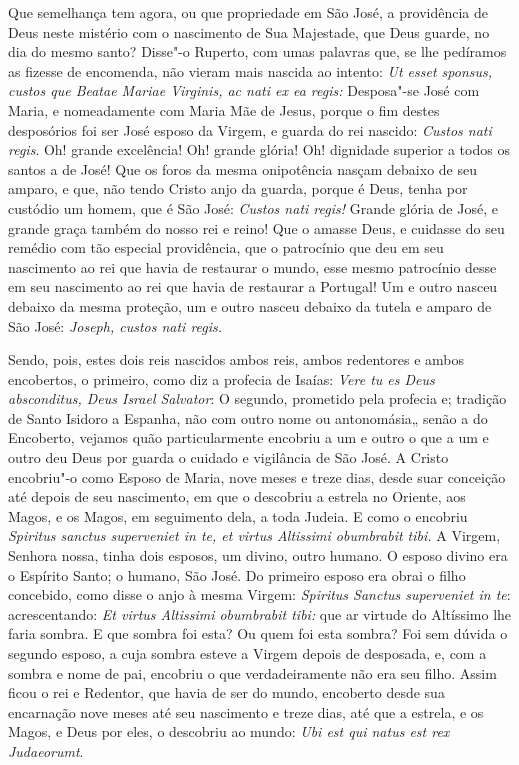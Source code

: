 Que semelhança tem agora, ou que propriedade em São José, a providência
de Deus neste mistério com o nascimento de Sua Majestade, que Deus
guarde, no dia do mesmo santo? Disse"-o Ruperto, com umas palavras que,
se lhe pedíramos as fizesse de encomenda, não vieram mais nascida ao
intento: \emph{Ut esset sponsus, custos que Beatae Mariae Virginis, ac
nati ex ea regis:} Desposa"-se José com Maria, e nomeadamente com Maria
Mãe de Jesus, porque o fim destes desposórios foi ser José esposo da
Virgem, e guarda do rei
nascido: \emph{Custos nati regis}. Oh! grande excelência! Oh! grande
glória! Oh! dignidade superior a todos os santos a de José! Que os foros
da mesma onipotência nasçam debaixo de seu amparo, e que, não tendo
Cristo anjo da guarda, porque é Deus, tenha por custódio um homem, que é
São José: \emph{Custos nati regis!} Grande glória de José, e grande
graça também do nosso rei e reino! Que o amasse Deus, e cuidasse do seu
remédio com tão especial providência, que o patrocínio que deu em seu
nascimento ao rei que havia de restaurar o mundo, esse mesmo patrocínio
desse em seu nascimento ao rei que havia de restaurar a Portugal! Um e
outro nasceu debaixo da mesma proteção, um e outro nasceu debaixo da
tutela e amparo de São José: \emph{Joseph, custos nati regis.}

Sendo, pois, estes dois reis nascidos ambos reis, ambos redentores e
ambos encobertos, o primeiro, como diz a profecia de Isaías: \emph{Vere
tu es Deus absconditus, Deus Israel Salvator}: O segundo,
prometido pela profecia e; tradição de Santo Isidoro a Espanha, não com
outro nome ou antonomásia„ senão a do Encoberto, vejamos quão
particularmente encobriu a um e outro o que a um e outro deu Deus por
guarda o cuidado e vigilância de São José. A Cristo encobriu"-o como
Esposo de Maria, nove meses e treze dias, desde suar conceição até
depois de seu nascimento, em que o descobriu a estrela no Oriente, aos
Magos, e os Magos, em seguimento dela, a toda Judeia. E como o encobriu
\emph{Spiritus sanctus superveniet in te, et virtus Altissimi obumbrabit
tibi.} A Virgem, Senhora nossa, tinha dois esposos, um divino,
outro humano. O esposo divino era o Espírito Santo; o humano, São José.
Do primeiro esposo era obrai o filho concebido, como disse o anjo à
mesma Virgem: \emph{Spiritus Sanctus superveniet in te}: acrescentando:
\emph{Et virtus Altissimi obumbrabit tibi:} que ar virtude do Altíssimo
lhe faria sombra. E que sombra foi esta? Ou quem foi esta sombra? Foi
sem dúvida o segundo esposo, a cuja sombra esteve a Virgem depois de
desposada, e, com a sombra e nome de pai, encobriu o que verdadeiramente
não era seu filho. Assim ficou o rei e Redentor, que havia de ser do
mundo, encoberto desde sua encarnação nove meses até seu nascimento e
treze dias, até que a estrela, e os Magos, e Deus por eles, o descobriu
ao mundo: \emph{Ubi est qui natus est rex Judaeorumt}.

